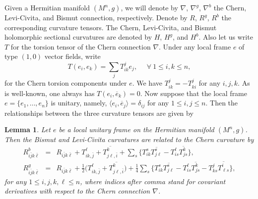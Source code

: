 \documentclass{amsart}
\newtheorem{lemma}{Lemma}
\numberwithin{equation}{section}
\begin{document}
Given a Hermitian manifold $(M^n,g)$, we will denote by $\nabla$, $\nabla^g$, $\nabla^b$ the Chern, Levi-Civita, and Bismut connection, respectively. Denote by $R$, $R^g$, $R^b$ the corresponding curvature tensors. The Chern, Levi-Civita, and Bismut holomorphic sectional curvatures are denoted by $H$, $H^g$, and $H^b$. Also let us write $T$ for the torsion tensor of the Chern connection $\nabla$. Under any local frame $e$ of type $(1,0)$ vector fields, write
\begin{equation}
T(e_i,e_k) = \sum_j T^j_{ik} e_j, \ \ \ \  \ \ \forall \ 1\leq i,k\leq n,
\end{equation}
for the Chern torsion components under $e$. We have $T^j_{ik}=-T^j_{ki}$ for any $i,j,k$. As is well-known, one always has $T(e_i, \overline{e}_k)=0$.
Now suppose that the local frame  $e=\{ e_1, \ldots , e_n\}$ is unitary, namely, $\langle e_i, \overline{e}_j\rangle = \delta_{ij}$ for any $1\leq i,j\leq n$. Then the relationships between the three curvature tensors are given by

\begin{lemma}
Let $e$ be a local unitary frame on the Hermitian manifold $(M^n,g)$. Then the Bismut and Levi-Civita curvatures are related to the Chern curvature by
\begin{eqnarray}
R^b_{i\bar{j}k\bar{\ell}} & = & R_{i\bar{j}k\bar{\ell}} +T^{\ell}_{ik,\bar{j}} + \overline{ T^k_{j\ell ,\bar{i}} } +\sum_s \big\{ T^s_{ik} \overline{ T^s_{j\ell }} - T^{\ell}_{is} \overline{ T^k_{js }} \big\},   \label{eq:RbR}\\
R^g_{i\bar{j}k\bar{\ell}} & = & R_{i\bar{j}k\bar{\ell}}  + \frac{1}{2} \big( T^{\ell}_{ik,\bar{j}} + \overline{ T^k_{j\ell ,\bar{i}} } \big)  +\frac{1}{4}\sum_s \big\{ T^s_{ik} \overline{ T^s_{j\ell }} - T^{\ell}_{is} \overline{ T^k_{js }} - T^{j}_{ks} \overline{ T^i_{\ell s }} \big\}, \label{eq:RgR}
\end{eqnarray}
for any $1\leq i,j,k,\ell \leq n$, where indices after comma stand for covariant derivatives with respect to the Chern connection $\nabla$.
\end{lemma}
\end{document}
